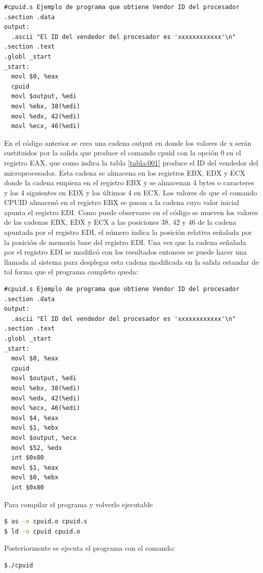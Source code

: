 \documentclass[12pt, twoside]{report}
\begin{document}
\begin{lstlisting}[language={[x86masm]Assembler}]
 #cpuid.s Ejemplo de programa que obtiene Vendor ID del procesador
.section .data
output:
  .ascii "El ID del vendedor del procesador es 'xxxxxxxxxxxx'\n"
.section .text
.globl _start
_start:
  movl $0, %eax
  cpuid
  movl $output, %edi
  movl %ebx, 38(%edi)
  movl %edx, 42(%edi)
  movl %ecx, 46(%edi)
\end{lstlisting}
En el código anterior se crea una cadena output en donde los valores de x serán sustituidos por la salida que produce el comando cpuid con la opción 0 en el registro EAX, que como indica la tabla \ref{tabla:001} produce el ID del vendedor del microprocesador. Esta cadena se almacena en los registros EBX, EDX y ECX donde la cadena empieza en el registro EBX y se almacenan 4 bytes o caracteres y los 4 siguientes en EDX y los últimos 4 en ECX.  Los valores de que el comando CPUID almacenó en el registro EBX se pasan a la cadena cuyo valor inicial apunta el registro EDI. Como puede observarse en el código se mueven los valores de las cadenas EBX, EDX y ECX a las posiciones 38, 42 y 46 de la cadena apuntada por el registro EDI, el número indica la posición relativa señalada por la posición de memoria base del registro EDI. Una vez que la cadena señalada por el registro EDI se modificó con los resultados entonces se puede hacer una llamada al sistema para desplegar esta cadena modificada en la salida estandar de tal forma que el programa completo queda:

\begin{lstlisting}[language={[x86masm]Assembler}]
#cpuid.s Ejemplo de programa que obtiene Vendor ID del procesador
.section .data
output:
  .ascii "El ID del vendedor del procesador es 'xxxxxxxxxxxx'\n"
.section .text
.globl _start
_start:
  movl $0, %eax
  cpuid
  movl $output, %edi
  movl %ebx, 38(%edi)
  movl %edx, 42(%edi)
  movl %ecx, 46(%edi)
  movl $4, %eax
  movl $1, %ebx
  movl $output, %ecx
  movl $52, %edx
  int $0x80
  movl $1, %eax
  movl $0, %ebx
  int $0x80
\end{lstlisting}

Para compilar el programa y volverlo ejecutable 

\begin{lstlisting}[language=bash]
$ as -o cpuid.o cpuid.s
$ ld -o cpuid cpuid.o
\end{lstlisting}

Posteriormente se ejecuta el programa con el comando:

\begin{lstlisting}[language=bash]
$./cpuid
\end{lstlisting}
\end{document}
